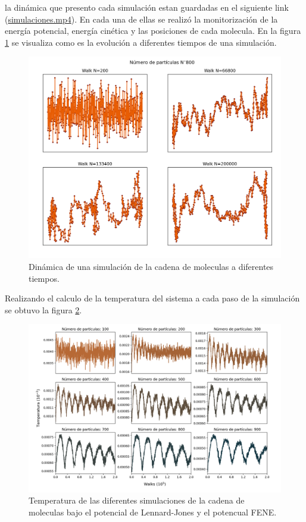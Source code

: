 la dinámica que presento cada simulación estan guardadas en el siguiente link (\href{https://github.com/giovannilopez9808/Notas_Agosto_2020/tree/master/Simulaciones/Proyecto_4/Graphics/simulaciones}{simulaciones.mp4}).
En cada una de ellas se realizó la monitorización de la energía potencial, energía cinética y las posiciones de cada molecula. En la figura \ref{fig:dim}
se visualiza como es la evolución a diferentes tiempos de una simulación.
\begin{figure}[H]
    \centering
    \hspace{-0.5cm}
    \includegraphics[scale=0.3]{../Graphics/dim_7.png}
    \caption{Dinámica de una simulación de la cadena de moleculas a diferentes tiempos.}
    \label{fig:dim}
\end{figure}
Realizando el calculo de la temperatura del sistema a cada paso de la simulación se obtuvo la figura \ref{fig:temp}.
\begin{figure}[H]
    \centering
    \hspace{-0.2cm}
    \includegraphics[scale=0.25]{../Graphics/temp.png}
    \caption{Temperatura de las diferentes simulaciones de la cadena de moleculas bajo el potencial de Lennard-Jones y el potencual FENE.}
    \label{fig:temp}
\end{figure}
